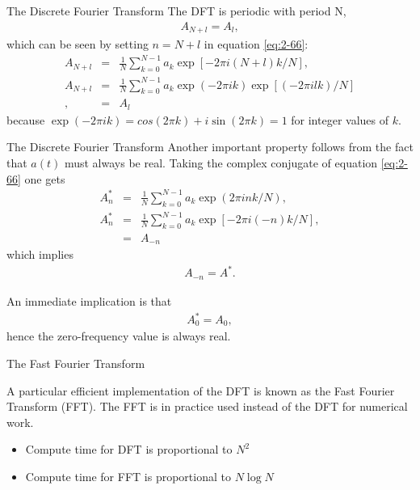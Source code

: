 \documentclass[xcolor=dvipsnames,notes]{beamer}
\begin{document}
\begin{frame}{The Discrete Fourier Transform}
The DFT is periodic with period N, 
\begin{eqnarray}
A_{N+l}=A_l,
\end{eqnarray}
which can be seen by setting $n=N+l$ in equation
\eqref{eq:2-66}:
%
\begin{eqnarray}
  A_{N+l}   &=& \frac{1}{N}\sum^{N-1}_{k=0} a_k\exp[-2\pi i (N+l) k/N],\nonumber\\
  A_{N+l}   &=& \frac{1}{N}\sum^{N-1}_{k=0} a_k\exp(-2\pi i k)\exp[(-2\pi i lk)/N] \nonumber\\,
            &=&A_l
    \label{eq:dft-period}
\end{eqnarray}
%
because $\exp(-2\pi i k)=cos(2\pi k)+i\sin(2\pi k)=1$ for integer values of $k$.
\end{frame}
\begin{frame}{The Discrete Fourier Transform}
Another important property follows from the fact that $a(t)$ must always be real.
Taking the complex conjugate of equation \eqref{eq:2-66} one gets
%
\begin{eqnarray}
  A^*_n   &=& \frac{1}{N}\sum^{N-1}_{k=0} a_k\exp(2\pi i n k/N), \nonumber\\
  A^*_n   &=& \frac{1}{N}\sum^{N-1}_{k=0} a_k\exp[-2\pi i (-n) k/N], \nonumber\\
          &=& A_{-n}
\end{eqnarray}
%
which implies
\begin{eqnarray}
A_{-n}=A^*.
\label{eq:dft-conjg}
\end{eqnarray}

An immediate implication is that
\begin{eqnarray}
A^*_0 = A_0,
\end{eqnarray}
hence the zero-frequency value is always real.
\end{frame}
\begin{frame}{The Fast Fourier Transform}

A particular efficient implementation of the DFT is known
as the Fast Fourier Transform (FFT). The FFT is in practice used instead
of the DFT for numerical work. 
\begin{itemize}
  \item Compute time for DFT is proportional to $N^2$
  \item Compute time for FFT is proportional to $N\log N$
\end{itemize}
\end{frame}
\end{document}
